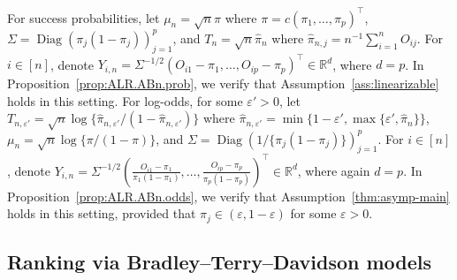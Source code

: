 \documentclass[12pt]{article}
\begin{document}
For success probabilities, let $\mu_n=\sqrt {n} \pi$ where $\pi=c(\pi_1, \ldots, \pi_p)^\top$, $\Sigma=\operatorname{Diag}(\pi_j(1-\pi_j))_{j=1}^p$, and $T_{n}=\sqrt{n}\widehat\pi_n$ where $\widehat\pi_{n,j}=n^{-1}\sum_{i=1}^n O_{ij}$. 
For $i\in[n]$, denote $Y_{i,n}=\Sigma^{-1/2}(O_{i1}-\pi_1,\ldots,O_{ip}-\pi_p)^\top\in\mathbb R^d$, where $d=p$. 
In Proposition~\ref{prop:ALR.ABn.prob}, we verify that Assumption~\ref{ass:linearizable} holds in this setting.
For log-odds, for some $\varepsilon' > 0$, let
$T_{n,\varepsilon'}=\sqrt n\log\{\widehat\pi_{n,\varepsilon'}/(1-\widehat\pi_{n,\varepsilon'})\}$ where $\widehat\pi_{n,\varepsilon'} = \min \{1-\varepsilon', \max\{\varepsilon', \widehat\pi_{n}\}\}$,
$\mu_n=\sqrt n\log\{\pi/(1-\pi)\}$, and
$\Sigma=\operatorname{Diag}\left(1/\{\pi_j(1-\pi_j)\}\right)_{j=1}^p$. For $i\in[n]$, denote
$Y_{i,n}=\Sigma^{-1/2}\left(\frac{O_{i1}-\pi_1}{\pi_1(1-\pi_1)},\ldots,\frac{O_{ip}-\pi_p}{\pi_p(1-\pi_p)}\right)^\top\in\mathbb R^d$, where again $d=p$.
In Proposition~\ref{prop:ALR.ABn.odds}, we verify that Assumption~\ref{thm:asymp-main} holds in this setting, provided that $\pi_j \in (\varepsilon, 1-\varepsilon)$ for some $\varepsilon > 0$.



\subsection{Ranking via Bradley--Terry--Davidson models}
\label{sec:BT}
\end{document}
